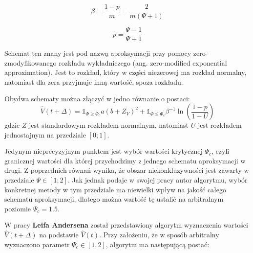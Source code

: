 \documentclass{pracamgr}
\begin{document}


\begin{equation}
\label{eq:beta}
\beta = \frac{1-p}{m} = \frac{2}{m(\Psi + 1)}
\end{equation}

\begin{equation}
\label{eq:p}
p = \frac{\Psi - 1}{\Psi + 1}
\end{equation}

Schemat ten znany jest pod nazwą aproksymacji przy pomocy zero-zmodyfikowanego rozkładu wykładniczego (ang. zero-modified exponential approximation). Jest to rozkład, który w części niezerowej ma rozkład normalny, natomiast dla zera przyjmuje inną wartość, spoza rozkładu. 


Obydwa schematy można złączyć w jedno równanie o postaci:
\begin{equation}
\label{eq:andersen}
\hat{V}(t + \Delta)  = \mathbb{1}_{\Phi \geq \Phi_c} a (b + Z_V)^2
 + \mathbb{1}_{\Phi \le \Phi_c} \beta^{-1} \ln (\frac{1-p}{1-U})
\end{equation}
gdzie $Z$ jest standardowym rozkładem normalnym, natomiast $U$ jest rozkładem jednostajnym na przedziale $[0;1]$.


Jedynym nieprecyzyjnym punktem jest wybór wartości krytycznej $\Psi_c$, czyli granicznej wartości dla której przychodzimy z jednego schematu aproksymacji w drugi. 
Z poprzednich równań wynika, że obszar niekonkluzywności jest zawarty w przedziale $\Psi \in [1;2]$.
Jak jednak podaje w swojej pracy autor algorytmu, wybór konkretnej metody w tym przedziale ma niewielki wpływ na jakość całego schematu aproksymacji, dlatego można wartość tę ustalić na arbitralnym poziomie $\Psi_c = 1.5$.
 


W pracy \textbf{Leifa Andersena} został przedstawiony algorytm wyznaczenia 
wartości $\hat{V}(t + \Delta)$ na podstawie $\hat{V}(t)$. Przy założeniu, 
że w sposób arbitralny wyznaczono parametr $\Psi_c \in [1,2]$, algorytm 
ma następującą postać:
\end{document}
